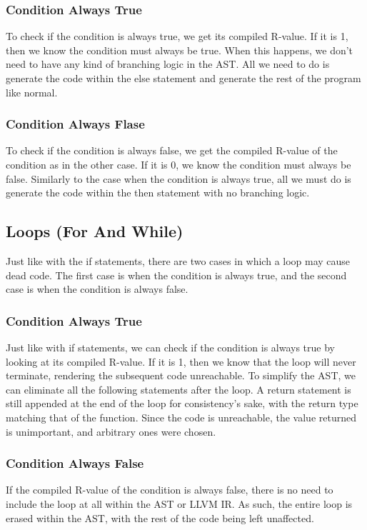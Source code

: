 \documentclass[sigconf]{acmart}
\begin{document}
\subsubsection{Condition Always True}
To check if the condition is always true, we get its compiled R-value. If it is 1, then we know 
the condition must always be true. When this happens, we don't need to have any kind of branching logic in the AST.
All we need to do is generate the code within the else statement and generate the rest of the program like normal. 

\subsubsection{Condition Always Flase}
To check if the condition is always false, we get the compiled R-value of the condition as in the other case. If it is 0, we know 
the condition must always be false. Similarly to the case when the condition is always true, all we must do is generate the code within 
the then statement with no branching logic. 

\subsection{Loops (For And While)}
Just like with the if statements, there are two cases in which a loop may cause dead code. The first case is when the condition 
is always true, and the second case is when the condition is always false.

\subsubsection{Condition Always True}
Just like with if statements, we can check if the condition is always true by looking at its compiled R-value.
If it is 1, then we know that the loop will never terminate, rendering the subsequent code unreachable. To simplify the AST, we can 
eliminate all the following statements after the loop. A return statement is still appended at the end of the loop for consistency's sake,
with the return type matching that of the function. Since the code is unreachable, the value returned is unimportant, and arbitrary
ones were chosen.

\subsubsection{Condition Always False}
If the compiled R-value of the condition is always false, there is no need to include the loop at all within the AST or LLVM IR. 
As such, the entire loop is erased within the AST, with the rest of the code being left unaffected.
\end{document}
